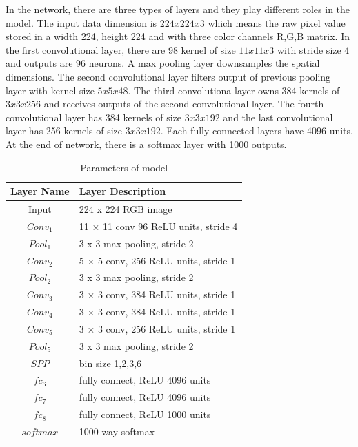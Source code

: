 In the network, there are three types of layers and they play different roles in the model. The input data dimension is $224x224x3$ which means the raw pixel value stored in a width 224, height 224 and with three color channels R,G,B matrix. In the first convolutional layer, there are 98 kernel of size $11x11x3$ with stride size 4 and outputs are 96 neurons. A max pooling layer downsamples the spatial dimensions. The second convolutional layer filters output of previous pooling layer with kernel size $5x5x48$. The third convolutiona layer owns 384 kernels of $3x3x256$ and receives outputs of the second convolutional layer. The fourth convolutional layer has 384 kernels of size $3x3x192$ and the last convolutional layer has 256 kernels of size $3x3x192$. Each fully connected layers have 4096 units. At the end of network, there is a softmax layer with 1000 outputs.
\begin{table}[h]
\begin{center}
    \begin{tabular}{ | c | p{8cm} | }
    \hline
    Layer Name & Layer Description \\ \hline
    Input & 224 x 224 RGB image \\ \hline
    $Conv_{1}$ & 11 × 11 conv 96 ReLU units, stride 4 \\ \hline
    $Pool_{1}$ & 3 x 3 max pooling, stride 2 \\ \hline
    $Conv_{2}$ & 5 × 5 conv, 256 ReLU units, stride 1 \\ \hline
    $Pool_{2}$ & 3 x 3 max pooling, stride 2 \\ \hline
    $Conv_{3}$ & 3 × 3 conv, 384 ReLU units, stride 1 \\ \hline
    $Conv_{4}$ & 3 × 3 conv, 384 ReLU units, stride 1 \\ \hline
    $Conv_{5}$ & 3 × 3 conv, 256 ReLU units, stride 1 \\ \hline
    $Pool_{5}$ & 3 x 3 max pooling, stride 2 \\ \hline
    $SPP$ & bin size 1,2,3,6 \\ \hline
    $fc_{6}$ & fully connect, ReLU 4096 units\\ \hline
    $fc_{7}$ & fully connect, ReLU 4096 units\\ \hline
    $fc_{8}$ & fully connect, ReLU 1000 units\\ \hline
    $softmax$ & 1000 way softmax\\ \hline
    \end{tabular}
    \caption{Parameters of model}
    \label{fig:NetPara}
\end{center}
\end{table}

















